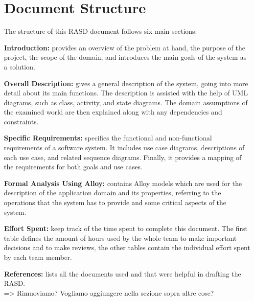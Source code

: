 \section{Document Structure}
The structure of this RASD document follows six main sections:
\begin{enumerate}
    \item \textbf{Introduction:}
          provides an overview of the problem at hand, the purpose of the project, 
          the scope of the domain, and introduces the main goals of the system as a solution.

    \item \textbf{Overall Description:}
          gives a general description of the system, going into more detail about its main functions.
          The description is assisted with the help of UML diagrams, such as class, activity, and state diagrams.
          The domain assumptions of the examined world are then explained along with any dependencies and constraints.

    \item \textbf{Specific Requirements:}
          specifies the functional and non-functional requirements of a software system.
          It includes use case diagrams, descriptions of each use case, and related sequence diagrams.
          Finally, it provides a mapping of the requirements for both goals and use cases.

    \item \textbf{Formal Analysis Using Alloy:}
          contains Alloy models which are used for the description of the application domain and its properties,
          referring to the operations that the system has to provide and some critical aspects of the system.

    \item \textbf{Effort Spent:}
          keep track of the time spent to complete this document.
          The first table defines the amount of hours used by the whole team to make important decisions and to make reviews,
          the other tables contain the individual effort spent by each team member.

    {\color{red}
    \item \textbf{References:}
          lists all the documents used and that were helpful in drafting the RASD. \\
          => Rimuoviamo? Vogliamo aggiungere nella sezione sopra altre cose?}
\end{enumerate}